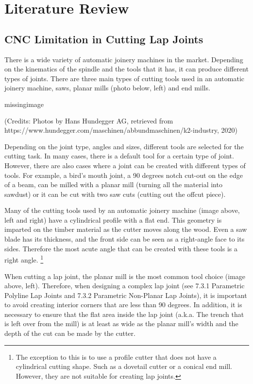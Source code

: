 \section{Literature Review}
\label{section:exploration_4_literature_review}

\subsection{CNC Limitation in Cutting Lap Joints}
\label{subsection:exploration_4_cnc_limitation_in_cutting_lap_joints}

There is a wide variety of automatic joinery machines in the market. Depending on the kinematics of the spindle and the tools that it has, it can produce different types of joints. There are three main types of cutting tools used in an automatic joinery machine, saws, planar mills (photo below, left) and end mills. 

missingimage

(Credits: Photos by Hans Hundegger AG, retrieved from https://www.hundegger.com/maschinen/abbundmaschinen/k2-industry, 2020)

Depending on the joint type, angles and sizes, different tools are selected for the cutting task. In many cases, there is a default tool for a certain type of joint. However, there are also cases where a joint can be created with different types of tools. For example, a bird's mouth joint, a 90 degrees notch cut-out on the edge of a beam, can be milled with a planar mill (turning all the material into sawdust) or it can be cut with two saw cuts (cutting out the offcut piece).

Many of the cutting tools used by an automatic joinery machine (image above, left and right) have a cylindrical profile with a flat end. This geometry is imparted on the timber material as the cutter moves along the wood. Even a saw blade has its thickness, and the front side can be seen as a right-angle face to its sides. Therefore the most acute angle that can be created with these tools is a right angle.
\footnote{The exception to this is to use a profile cutter that does not have a cylindrical cutting shape. Such as a dovetail cutter or a conical end mill. However, they are not suitable for creating lap joints.}

When cutting a lap joint, the planar mill is the most common tool choice (image above, left). Therefore, when designing a complex lap joint (see 7.3.1 Parametric Polyline Lap Joints and 7.3.2 Parametric Non-Planar Lap Joints), it is important to avoid creating interior corners that are less than 90 degrees. In addition, it is necessary to ensure that the flat area inside the lap joint (a.k.a. The trench that is left over from the mill) is at least as wide as the planar mill’s width and the depth of the cut can be made by the cutter.

